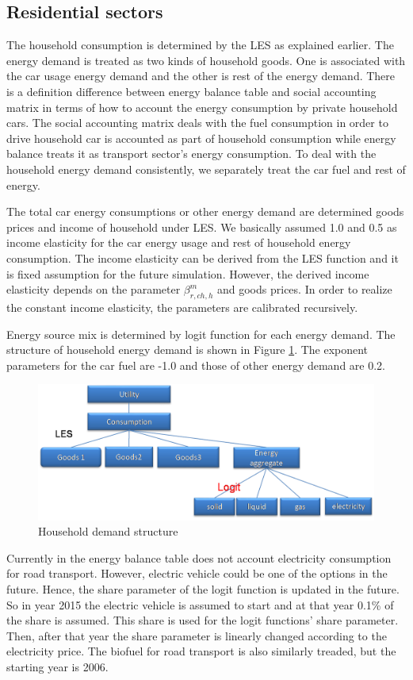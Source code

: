 \documentclass[10pt,a4paper,titlepage,dvipdfmx]{book}
\begin{document}
\begin{itemize}
\subsection{\label{subsec:ResSec}{Residential sectors}}

The household consumption is determined by the LES as explained earlier. The energy demand is treated as two kinds of household goods. One is associated with the car usage energy demand and the other is rest of the energy demand. There is a definition difference between energy balance table and social accounting matrix in terms of how to account the energy consumption by private household cars. The social accounting matrix deals with the fuel consumption in order to drive household car is accounted as part of household consumption while energy balance treats it as transport sector's energy consumption. To deal with the household energy demand consistently, we separately treat the car fuel and rest of energy.

The total car energy consumptions or other energy demand are determined goods prices and income of household under LES. We basically assumed 1.0 and 0.5 as income elasticity for the car energy usage and rest of household energy consumption. The income elasticity can be derived from the LES function and it is fixed assumption for the future simulation. However, the derived income elasticity depends on the parameter $\beta _{r,ch,h}^{m}$ and goods prices. In order to realize the constant income elasticity, the parameters are calibrated recursively.

Energy source mix is determined by logit function for each energy demand. The structure of household energy demand is shown in Figure \ref{fig:HouDemStr}. The exponent parameters for the car fuel are -1.0 and those of other energy demand are 0.2.
\begin{figure}
\includegraphics[width=1\textwidth]{fig/image20.png}
\caption{Household demand structure\label{fig:HouDemStr}}
\end{figure}
Currently in the energy balance table does not account electricity consumption for road transport. However, electric vehicle could be one of the options in the future. Hence, the share parameter of the logit function is updated in the future. So in year 2015 the electric vehicle is assumed to start and at that year 0.1\% of the share is assumed. This share is used for the logit functions' share parameter. Then, after that year the share parameter is linearly changed according to the electricity price. The biofuel for road transport is also similarly treaded, but the starting year is 2006.


\end{itemize}
\end{document}
